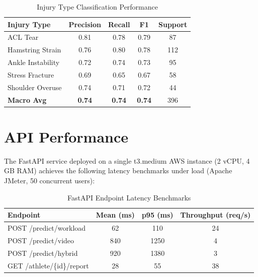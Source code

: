 \documentclass[12pt,a4paper]{report}
\begin{document}
\begin{table}[h!]
  \centering
  \caption{Injury Type Classification Performance}
  \label{tab:injury_class}
  \vspace*{5pt}
  \begin{tabular}{|l|c|c|c|c|}
    \hline
    \textbf{Injury Type} & \textbf{Precision} & \textbf{Recall} & \textbf{F1} & \textbf{Support} \\ \hline
    ACL Tear             & 0.81 & 0.78 & 0.79 & 87  \\ \hline
    Hamstring Strain     & 0.76 & 0.80 & 0.78 & 112 \\ \hline
    Ankle Instability    & 0.72 & 0.74 & 0.73 & 95  \\ \hline
    Stress Fracture      & 0.69 & 0.65 & 0.67 & 58  \\ \hline
    Shoulder Overuse     & 0.74 & 0.71 & 0.72 & 44  \\ \hline
    \textbf{Macro Avg}   & \textbf{0.74} & \textbf{0.74} & \textbf{0.74} & 396 \\ \hline
  \end{tabular}
\end{table}

\section{API Performance}

The FastAPI service deployed on a single t3.medium AWS instance (2 vCPU, 4 GB RAM) achieves the following latency benchmarks under load (Apache JMeter, 50 concurrent users):

\begin{table}[h!]
  \centering
  \caption{FastAPI Endpoint Latency Benchmarks}
  \label{tab:api_perf}
  \vspace*{5pt}
  \begin{tabular}{|l|c|c|c|}
    \hline
    \textbf{Endpoint} & \textbf{Mean (ms)} & \textbf{p95 (ms)} & \textbf{Throughput (req/s)} \\ \hline
    POST /predict/workload & 62  & 110 & 24 \\ \hline
    POST /predict/video    & 840 & 1250 & 4  \\ \hline
    POST /predict/hybrid   & 920 & 1380 & 3  \\ \hline
    GET  /athlete/\{id\}/report & 28 & 55 & 38 \\ \hline
  \end{tabular}
\end{table}
\end{document}
